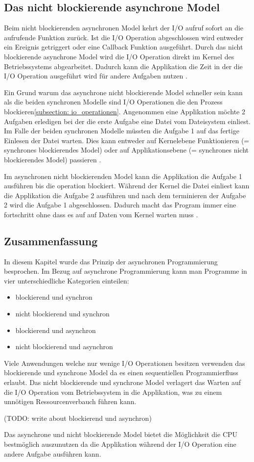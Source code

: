 \subsection{Das nicht blockierende asynchrone Model}
Beim nicht blockierenden asynchronen Model kehrt der I/O aufruf sofort an die aufrufende Funktion zurück. Ist die I/O Operation abgeschlossen wird entweder ein Ereignis getriggert oder eine Callback Funktion ausgeführt. Durch das nicht blockierende asynchrone Model wird die I/O Operation direkt im Kernel des Betriebssystems abgearbeitet. Dadurch kann die Applikation die Zeit in der die I/O Operation ausgeführt wird für andere Aufgaben nutzen \cite[p. 48]{Erb2012}.

Ein Grund warum das asynchrone nicht blockierende Model schneller sein kann als die beiden synchronen Modelle sind I/O Operationen die den Prozess blockieren\ref{subsection: io_operationen}. Angenommen eine Applikation möchte 2 Aufgaben erledigen bei der die erste Aufgabe eine Datei vom Dateisystem einliest. Im Falle der beiden synchronen Modelle müssten die Aufgabe 1 auf das fertige Einlesen der Datei warten. Dies kann entweder auf Kernelebene Funktionieren (= synchrones blockierendes Model) oder auf Applikationsebene (= synchrones nicht blockierendes Model) passieren \cite[]{Pet2015}. 

Im asynchronen nicht blockierenden Model kann die Applikation die Aufgabe 1 ausführen bis die operation blockiert. Während der Kernel die Datei einliest kann die Applikation die Aufgabe 2 ausführen und nach dem terminieren der Aufgabe 2 wird die Aufgabe 1 abgeschlossen. Dadurch macht das Program immer eine fortschritt ohne dass es auf auf Daten vom Kernel warten muss \cite[]{Pet2015}.

\subsection{Zusammenfassung}

In diesem Kapitel wurde das Prinzip der asynchronen Programmierung besprochen. Im Bezug auf asynchrone Programmierung kann man Programme in vier unterschiedliche Kategorien einteilen: 

\begin{itemize}
  \item blockierend und synchron
  \item nicht blockierend und synchron
  \item blockierend und asynchron
  \item nicht blockierend und asynchron
\end{itemize}    

Viele Anwendungen welche nur wenige I/O Operationen besitzen verwenden das blockierende und synchrone Model da es einen sequentiellen Programmierfluss erlaubt. Das nicht blockierende und synchrone Model verlagert das Warten auf die I/O Operation vom Betriebssystem in die Applikation, was zu einem unnötigen Ressourcenverbauch führen kann. 

(TODO: write about blockierend und asynchron)

Das asynchrone und nicht blockierende Model bietet die Möglichkeit die CPU bestmöglich auszunutzen da die Applikation während der I/O Operation eine andere Aufgabe ausführen kann.